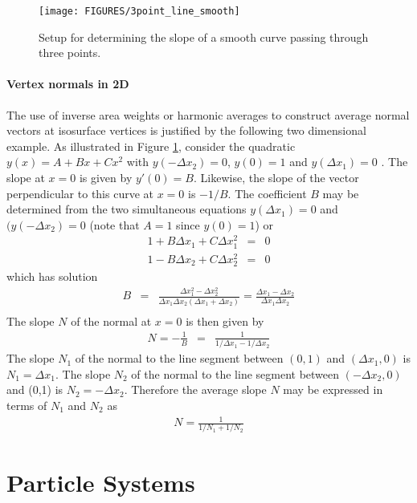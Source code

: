 \documentclass[11pt,twoside]{book}
\newcommand{\figoptions}{htp}
\begin{document}
%
%

\begin{figure}[\figoptions]
\begin{center}
\texttt{[image: FIGURES/3point\_line\_smooth]}
\end{center}
\caption{Setup for determining the slope of a smooth curve passing through three points.}
\label{figlinesmooth}%
\end{figure}

\paragraph{Vertex normals in 2D} The use of inverse area weights or harmonic averages to construct average normal vectors at isosurface vertices is justified by the following two dimensional example.  As illustrated in Figure \ref{figlinesmooth}, consider the quadratic $y(x)=A+Bx+Cx^2$ with $y(-\Delta x_2)=0$, $y(0)=1$ and $y(\Delta x_1)=0$ .  The slope at $x=0$ is given by $y'(0)=B$.  Likewise, the slope of the vector perpendicular to this curve at $x=0$ is $-1/B$.  The coefficient $B$ may be determined from the two simultaneous equations $y(\Delta x_1)=0$ and  $(y(-\Delta x_2)=0$ (note that $A=1$ since $y(0)=1$) or
\begin{eqnarray*}
1+B\Delta x_1 + C \Delta x_1^2 &= &0\\
1-B\Delta x_2 + C \Delta x_2^2 &= &0
\end{eqnarray*}
which has solution
\begin{eqnarray*}
B&=&\frac{\Delta x_1^2-\Delta x_2^2}{\Delta x_1\Delta x_2(\Delta x_1+\Delta x_2)}=
\frac{\Delta x_1-\Delta x_2}{\Delta x_1\Delta x_2}\\
\end{eqnarray*}
The slope $N$ of the normal at $x=0$ is then given by
\begin{eqnarray*}
N=-\frac{1}{B}&=&\frac{1}{1/\Delta x_1-1/\Delta x_2}
\end{eqnarray*}
The slope $N_1$ of the normal to the line segment between $(0,1)$ and $(\Delta x_1,0)$ is $N_1=\Delta x_1$.
The slope $N_2$ of the normal to the line segment between $(-\Delta x_2,0)$ and (0,1) is $N_2=-\Delta x_2$.
Therefore the average slope $N$ may be expressed in terms of $N_1$ and $N_2$ as
\begin{eqnarray*}
N=\frac{1}{1/N_1+1/N_2}
\end{eqnarray*}

\section{Particle Systems}
\end{document}
